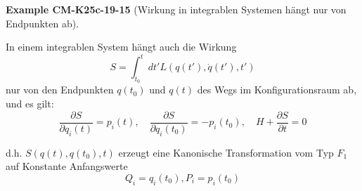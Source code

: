 \documentclass[10pt, letterpaper]{article}
\newcommand{\CustomHeading}[3]{%
  \par\medskip\noindent%
  \textbf{#1 #2} \textnormal{(#3)}.\enskip%
}
\newenvironment{EXA}[2]{\CustomHeading{Example}{#1}{#2}}{}
\begin{document}
\begin{EXA}{CM-K25c-19-15}{Wirkung in integrablen Systemen hängt nur von Endpunkten ab}
In einem integrablen System hängt auch die Wirkung
\[
S = \int_{t_0}^t dt' L(q(t'), \dot{q}(t'), t')
\]
nur von den Endpunkten $q(t_0)$ und $q(t)$ des Wegs im Konfigurationsraum ab, und es gilt:
\[
\frac{\partial S}{\partial q_i(t)} = p_i(t), \quad \frac{\partial S}{\partial q_i(t_0)} = -p_i(t_0), \quad H + \frac{\partial S}{\partial t} = 0
\]

\noindent
d.h. $S(q(t), q(t_0), t)$ erzeugt eine Kanonische Transformation vom Typ $F_1$ auf Konstante Anfangswerte 
$$Q_i = q_i(t_0), P_i = p_i(t_0)$$
\end{EXA}
\end{document}
